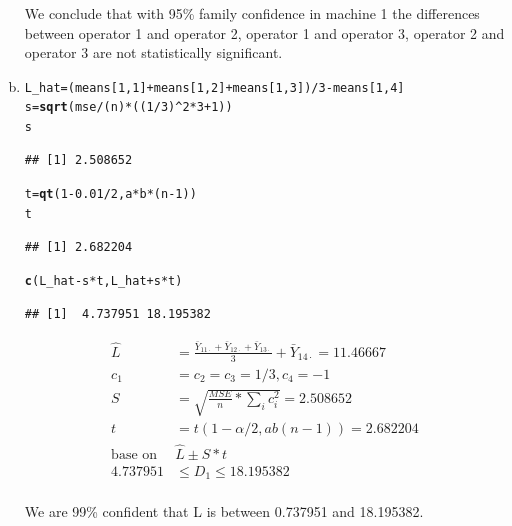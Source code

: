 \documentclass{article}\usepackage[]{graphicx}\usepackage[]{color}
\makeatletter
\newcommand{\hlnum}[1]{\textcolor[rgb]{0.686,0.059,0.569}{#1}}%
\newcommand{\hlopt}[1]{\textcolor[rgb]{0,0,0}{#1}}%
\newcommand{\hlstd}[1]{\textcolor[rgb]{0.345,0.345,0.345}{#1}}%
\newcommand{\hlkwb}[1]{\textcolor[rgb]{0.69,0.353,0.396}{#1}}%
\newcommand{\hlkwd}[1]{\textcolor[rgb]{0.737,0.353,0.396}{\textbf{#1}}}%
\newenvironment{kframe}{%
 \def\at@end@of@kframe{}%
 \ifinner\ifhmode%
  \def\at@end@of@kframe{\end{minipage}}%
  \begin{minipage}{\columnwidth}%
 \fi\fi%
 \def\FrameCommand##1{\hskip\@totalleftmargin \hskip-\fboxsep
 \colorbox{shadecolor}{##1}\hskip-\fboxsep
     \hskip-\linewidth \hskip-\@totalleftmargin \hskip\columnwidth}%
 \MakeFramed {\advance\hsize-\width
   \@totalleftmargin\z@ \linewidth\hsize
   \@setminipage}}%
 {\par\unskip\endMakeFramed%
 \at@end@of@kframe}
\newenvironment{knitrout}{}{} %
\makeatother
\begin{document}
\begin{enumerate}[(a)]
\qquad We conclude that with 95\% family confidence in machine 1 the differences between operator 1 and operator 2, operator 1 and operator 3, operator 2 and operator 3 are not statistically significant.

\item

\begin{knitrout}
\color{fgcolor}\begin{kframe}
\begin{alltt}
  \hlstd{L_hat} \hlkwb{=} \hlstd{(means[}\hlnum{1}\hlstd{,}\hlnum{1}\hlstd{]}\hlopt{+}\hlstd{means[}\hlnum{1}\hlstd{,}\hlnum{2}\hlstd{]}\hlopt{+}\hlstd{means[}\hlnum{1}\hlstd{,}\hlnum{3}\hlstd{])}\hlopt{/}\hlnum{3} \hlopt{-} \hlstd{means[}\hlnum{1}\hlstd{,}\hlnum{4}\hlstd{]}
  \hlstd{s} \hlkwb{=} \hlkwd{sqrt}\hlstd{(mse}\hlopt{/}\hlstd{(n)}\hlopt{*}\hlstd{((}\hlnum{1}\hlopt{/}\hlnum{3}\hlstd{)}\hlopt{^}\hlnum{2}\hlopt{*}\hlnum{3}\hlopt{+}\hlnum{1}\hlstd{))}
  \hlstd{s}
\end{alltt}
\begin{verbatim}
## [1] 2.508652
\end{verbatim}
\begin{alltt}
  \hlstd{t} \hlkwb{=} \hlkwd{qt}\hlstd{(}\hlnum{1}\hlopt{-}\hlnum{0.01}\hlopt{/}\hlnum{2}\hlstd{, a}\hlopt{*}\hlstd{b}\hlopt{*}\hlstd{(n}\hlopt{-}\hlnum{1}\hlstd{))}
  \hlstd{t}
\end{alltt}
\begin{verbatim}
## [1] 2.682204
\end{verbatim}
\begin{alltt}
  \hlkwd{c}\hlstd{(L_hat}\hlopt{-}\hlstd{s}\hlopt{*}\hlstd{t, L_hat}\hlopt{+}\hlstd{s}\hlopt{*}\hlstd{t)}
\end{alltt}
\begin{verbatim}
## [1]  4.737951 18.195382
\end{verbatim}
\end{kframe}
\end{knitrout}

\begin{displaymath}
\begin{split}
\hat{L} &= \frac{\bar{Y}_{11\cdot}+\bar{Y}_{12\cdot}+\bar{Y}_{13\cdot}}{3}+\bar{Y}_{14\cdot} = 11.46667\\
c_1 &= c_2 = c_3 = 1/3, c_4 = -1\\
S &= \sqrt{\frac{MSE}{n}*\sum_i c_i^2} = 2.508652 \\
t &= t(1-\alpha/2, ab(n-1))=2.682204\\
\text{base on } &\hat{L} \pm S*t\\
4.737951 & \leq D_1 \leq 18.195382  \\
\end{split}
\end{displaymath}

\qquad We are 99\% confident that L is between 0.737951 and  18.195382.

\end{enumerate}
\end{document}
